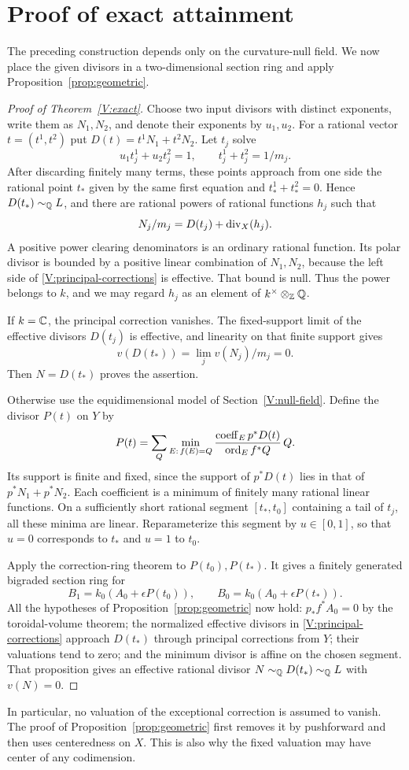 \section{Proof of exact attainment}
\label{V:exact-proof}

The preceding construction depends only on the curvature-null field.
We now place the given divisors in a two-dimensional section ring and
apply Proposition~\ref{prop:geometric}.

\begin{proof}[Proof of Theorem~\ref{V:exact}]
Choose two input divisors with distinct exponents, write them as
$N_1,N_2$, and denote their exponents by $u_1,u_2$. For a rational
vector $t=(t^1,t^2)$ put $D(t)=t^1N_1+t^2N_2$. Let $t_j$ solve
\[
 u_1t_j^1+u_2t_j^2=1,\qquad t_j^1+t_j^2=1/m_j.
\]
After discarding finitely many terms, these points approach from one
side the rational point $t_*$ given by the same first equation and
$t_*^1+t_*^2=0$. Hence $D(t_*)\sim_{\mathbb Q}L$, and there are rational
powers of rational functions $h_j$ such that
\begin{equation}\label{V:principal-corrections}
 N_j/m_j=D(t_j)+\operatorname{div}_X(h_j).
\end{equation}
A positive power clearing denominators is an ordinary rational function.
Its polar divisor is bounded by a positive linear combination of $N_1,N_2$,
because the left side of \eqref{V:principal-corrections} is effective.
That bound is null. Thus the power belongs to $k$, and we may regard
$h_j$ as an element of $k^\times\otimes_{\mathbb Z}\mathbb Q$.

If $k=\mathbb C$, the principal correction vanishes. The fixed-support limit
of the effective divisors $D(t_j)$ is effective, and linearity on that
finite support gives
\[
 v(D(t_*))=\lim_j v(N_j)/m_j=0.
\]
Then $N=D(t_*)$ proves the assertion.

Otherwise use the equidimensional model of Section~\ref{V:null-field}.
Define the divisor $P(t)$ on $Y$ by
\[
 P(t)=\sum_Q\min_{E:\,f(E)=Q}
 \frac{\operatorname{coeff}_E p^*D(t)}{\operatorname{ord}_E f^*Q}\,Q.
\]
Its support is finite and fixed, since the support of $p^*D(t)$ lies
in that of $p^*N_1+p^*N_2$. Each coefficient is a minimum of finitely
many rational linear functions. On a sufficiently short rational
segment $[t_*,t_0]$ containing a tail of $t_j$, all these minima are
linear. Reparameterize this segment by $u\in[0,1]$, so that $u=0$
corresponds to $t_*$ and $u=1$ to $t_0$.

Apply the correction-ring theorem to $P(t_0),P(t_*)$. It gives a
finitely generated bigraded section ring for
\[
 B_1=k_0(A_0+\epsilon P(t_0)),\qquad
 B_0=k_0(A_0+\epsilon P(t_*)).
\]
All the hypotheses of Proposition~\ref{prop:geometric} now hold:
$p_*f^*A_0=0$ by the toroidal-volume theorem; the normalized effective
divisors in \eqref{V:principal-corrections} approach $D(t_*)$ through
principal corrections from $Y$; their valuations tend to zero; and
the minimum divisor is affine on the chosen segment. That proposition
gives an effective rational divisor $N\sim_{\mathbb Q}D(t_*)\sim_{\mathbb Q}L$
with $v(N)=0$.
\end{proof}

In particular, no valuation of the exceptional correction is assumed to
vanish. The proof of Proposition~\ref{prop:geometric} first removes it
by pushforward and then uses centeredness on $X$. This is also why the
fixed valuation may have center of any codimension.
